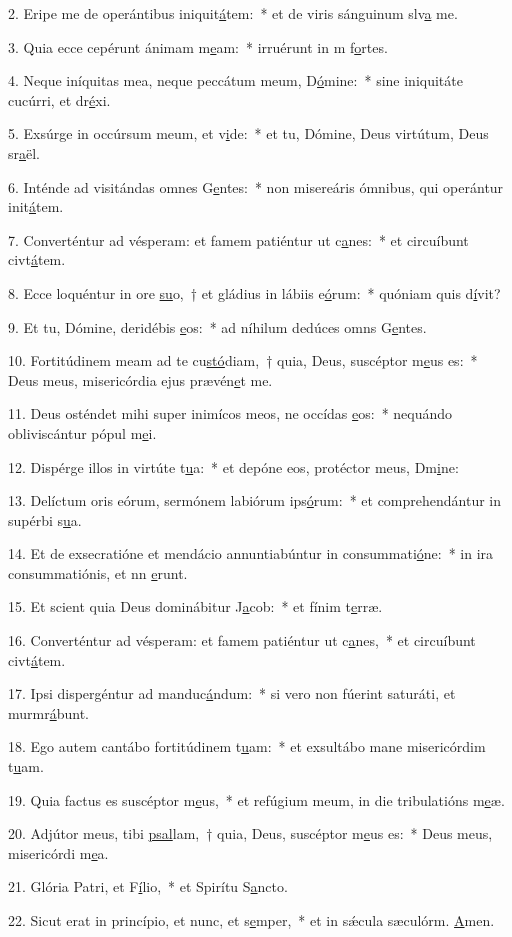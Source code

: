 2. Eripe me de operántibus iniquit\uline{á}tem:~* et de viris sánguinum slv\uline{a} me.\par 
3. Quia ecce cepérunt ánimam m\uline{e}am:~* irruérunt in m f\uline{o}rtes.\par 
4. Neque iníquitas mea, neque peccátum meum, D\uline{ó}mine:~* sine iniquitáte cucúrri, et dr\uline{é}xi.\par 
5. Exsúrge in occúrsum meum, et v\uline{i}de:~* et tu, Dómine, Deus virtútum, Deus sr\uline{a}ël.\par 
6. Inténde ad visitándas omnes G\uline{e}ntes:~* non misereáris ómnibus, qui operántur init\uline{á}tem.\par 
7. Converténtur ad vésperam: et famem patiéntur ut c\uline{a}nes:~* et circuíbunt civt\uline{á}tem.\par 
8. Ecce loquéntur in ore \uline{su}o,~† et gládius in lábiis e\uline{ó}rum:~* quóniam quis d\uline{í}vit?\par 
9. Et tu, Dómine, deridébis \uline{e}os:~* ad níhilum dedúces omns G\uline{e}ntes.\par 
10. Fortitúdinem meam ad te cu\uline{stó}diam,~† quia, Deus, suscéptor m\uline{e}us es:~* Deus meus, misericórdia ejus prævén\uline{e}t me.\par 
11. Deus osténdet mihi super inimícos meos, ne occídas \uline{e}os:~* nequándo obliviscántur pópul m\uline{e}i.\par 
12. Dispérge illos in virtúte t\uline{u}a:~* et depóne eos, protéctor meus, Dm\uline{i}ne:\par 
13. Delíctum oris eórum, sermónem labiórum ips\uline{ó}rum:~* et comprehendántur in supérbi s\uline{u}a.\par 
14. Et de exsecratióne et mendácio annuntiabúntur in consummati\uline{ó}ne:~* in ira consummatiónis, et nn \uline{e}runt.\par 
15. Et scient quia Deus dominábitur J\uline{a}cob:~* et fínim t\uline{e}rræ.\par 
16. Converténtur ad vésperam: et famem patiéntur ut c\uline{a}nes,~* et circuíbunt civt\uline{á}tem.\par 
17. Ipsi dispergéntur ad manduc\uline{á}ndum:~* si vero non fúerint saturáti, et murmr\uline{á}bunt.\par 
18. Ego autem cantábo fortitúdinem t\uline{u}am:~* et exsultábo mane misericórdim t\uline{u}am.\par 
19. Quia factus es suscéptor m\uline{e}us,~* et refúgium meum, in die tribulatións m\uline{e}æ.\par 
20. Adjútor meus, tibi \uline{psal}lam,~† quia, Deus, suscéptor m\uline{e}us es:~* Deus meus, misericórdi m\uline{e}a.\par 
21. Glória Patri, et F\uline{í}lio,~* et Spirítu S\uline{a}ncto.\par 
22. Sicut erat in princípio, et nunc, et s\uline{e}mper,~* et in sǽcula sæculórm. \uline{A}men.\par 
